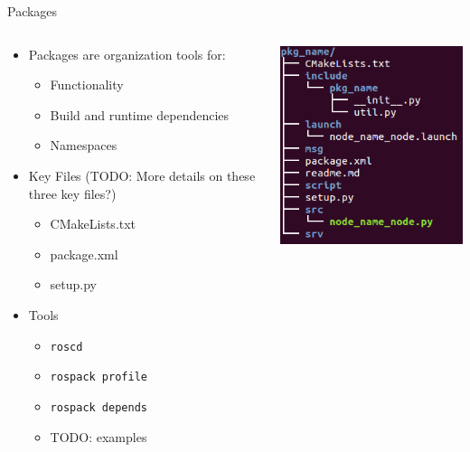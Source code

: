 \documentclass[aspectratio=43]{beamer}
\begin{document}
\begin{frame}{Packages}
\begin{columns}
	\begin{column}{0.6\textwidth}
		\begin{itemize}
			\item Packages are organization tools for:
			\begin{itemize}
				\item Functionality
				\item Build and runtime dependencies
				\item Namespaces
			\end{itemize}
			\item Key Files (TODO: More details on these three key files?)
				\begin{itemize}
					\item CMakeLists.txt
					\item package.xml
					\item setup.py
				\end{itemize}
			\item Tools
				\begin{itemize}
					\item \texttt{roscd}
					\item \texttt{rospack profile}
					\item \texttt{rospack depends}
					\item TODO: examples
				\end{itemize}
		\end{itemize}
	\end{column}
	\begin{column}{0.4\textwidth}
		\centering
		\includegraphics[width=\textwidth]{fig/pkg_tree.png}
	\end{column}
\end{columns}

\end{frame}
\end{document}

